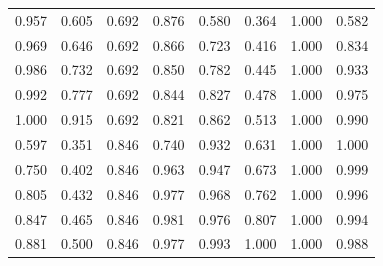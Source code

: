 \begin{longtable}[c]{@{}cccc|cccc@{}}
0.957                            & 0.605                      & 0.692                 & 0.876                       & 0.580                            & 0.364                      & 1.000                 & 0.582                       \\
0.969                            & 0.646                      & 0.692                 & 0.866                       & 0.723                            & 0.416                      & 1.000                 & 0.834                       \\
0.986                            & 0.732                      & 0.692                 & 0.850                       & 0.782                            & 0.445                      & 1.000                 & 0.933                       \\
0.992                            & 0.777                      & 0.692                 & 0.844                       & 0.827                            & 0.478                      & 1.000                 & 0.975                       \\
1.000                            & 0.915                      & 0.692                 & 0.821                       & 0.862                            & 0.513                      & 1.000                 & 0.990                       \\
0.597                            & 0.351                      & 0.846                 & 0.740                       & 0.932                            & 0.631                      & 1.000                 & 1.000                       \\
0.750                            & 0.402                      & 0.846                 & 0.963                       & 0.947                            & 0.673                      & 1.000                 & 0.999                       \\
0.805                            & 0.432                      & 0.846                 & 0.977                       & 0.968                            & 0.762                      & 1.000                 & 0.996                       \\
0.847                            & 0.465                      & 0.846                 & 0.981                       & 0.976                            & 0.807                      & 1.000                 & 0.994                       \\
0.881                            & 0.500                      & 0.846                 & 0.977                       & 0.993                            & 1.000                      & 1.000                 & 0.988                       \\* \bottomrule
\end{longtable}

